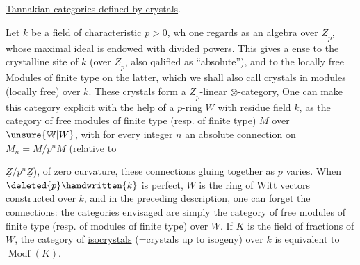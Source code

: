\uline{Tannakian categories defined by crystals}.

 Let $k$ be a field of characteristic $p>0$, wh one regards as an algebra over $\underline{Z}_p$, whose maximal ideal is endowed with divided powers. This gives a ense to the crystalline site of $k$ (over $\underline{Z}_p$, also qalified as ``absolute''), and to the locally free Modules of finite type on the latter, which we shall also call crystals in modules (locally free) over $k$. These crystals form a $\underline{Z}_p$-linear $\otimes$-category,  One can make this category explicit with the help of a $p$-ring $W$ with residue field $k$, as the category of free modules of finite type (resp. of finite type) $M$ over $\unsure{\mathbb{W}|W}$, with for every integer $n$ an absolute connection on $M_n=M/p^nM$ (relative to  $\underline{Z}/p^n\underline{Z}$), of zero curvature, these connections gluing together as $p$ varies. When $\deleted{p}\handwritten{k}$ is perfect, $W$ is the ring of Witt vectors constructed over $k$, and in the preceding description, one can forget the connections: the categories envisaged are simply the category of free modules of finite type (resp. of modules of finite type) over $W$. If $K$ is the field of fractions of $W$, the category of \uline{isocrystals}  (=crystals up to isogeny) over $k$ is equivalent to $\operatorname{Modf}(K)$. 

